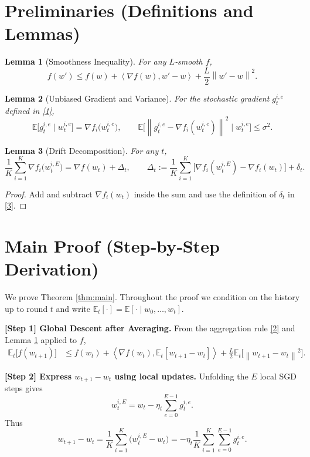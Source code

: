 \documentclass{article}
\newtheorem{lemma}{Lemma}
\newcommand{\E}{\mathbb{E}}
\newcommand{\norm}[1]{\left\lVert #1 \right\rVert}
\newcommand{\inner}[2]{\left\langle #1, #2 \right\rangle}
\newcommand{\grad}{\nabla}
\begin{document}
\section*{Preliminaries (Definitions and Lemmas)}
\begin{lemma}[Smoothness Inequality]\label{lem:smooth}
For any $L$‑smooth $f$,
\[
f(w')\le f(w)+\inner{\grad f(w)}{w'-w}+\frac{L}{2}\norm{w'-w}^2 .
\]
\end{lemma}
\begin{lemma}[Unbiased Gradient and Variance]\label{lem:unbiased}
For the stochastic gradient $g_{t}^{i,e}$ defined in \eqref{1},
\[
\E\!\bigl[g_{t}^{i,e}\mid w_{t}^{i,e}\bigr]=\grad f_i\!\bigl(w_{t}^{i,e}\bigr),\qquad
\E\!\bigl[\norm{g_{t}^{i,e}-\grad f_i(w_{t}^{i,e})}^2\mid w_{t}^{i,e}\bigr]\le\sigma^2 .
\]
\end{lemma}
\begin{lemma}[Drift Decomposition]\label{lem:drift}
For any $t$,
\[
\frac1K\sum_{i=1}^K\grad f_i\!\bigl(w_{t}^{i,E}\bigr)
=
\grad f(w_t)+\Delta_t,
\qquad
\Delta_t:=\frac1K\sum_{i=1}^K\bigl[\grad f_i(w_{t}^{i,E})-\grad f_i(w_t)\bigr]+\delta_t .
\]
\end{lemma}
\begin{proof}
Add and subtract $\grad f_i(w_t)$ inside the sum and use the definition of $\delta_t$ in \eqref{3}. \qedhere
\end{proof}

\section*{Main Proof (Step‑by‑Step Derivation)}
We prove Theorem \ref{thm:main}. Throughout the proof we condition on the history up to round $t$ and write $\E_t[\cdot]=\E[\cdot\mid w_0,\dots,w_t]$.

\bigskip
\noindent\textbf{[Step 1] Global Descent after Averaging.}  
From the aggregation rule \eqref{2} and Lemma \ref{lem:smooth} applied to $f$,
\begin{align}
\E_t\!\bigl[f(w_{t+1})\bigr]
&\le f(w_t)
   +\inner{\grad f(w_t)}{\E_t[w_{t+1}-w_t]}
   +\frac{L}{2}\E_t\!\bigl[\norm{w_{t+1}-w_t}^2\bigr].
\tag{5}
\end{align}

\bigskip
\noindent\textbf{[Step 2] Express $w_{t+1}-w_t$ using local updates.}  
Unfolding the $E$ local SGD steps gives
\[
w_{t}^{i,E}=w_t-\eta_t\sum_{e=0}^{E-1} g_{t}^{i,e}.
\]
Thus
\[
w_{t+1}-w_t
= \frac1K\sum_{i=1}^K\bigl(w_{t}^{i,E}-w_t\bigr)
= -\eta_t\frac1K\sum_{i=1}^K\sum_{e=0}^{E-1} g_{t}^{i,e}.
\tag{6}
\]
\end{document}
